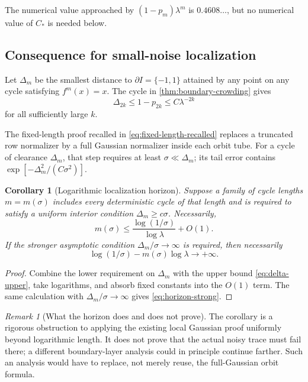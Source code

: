 \documentclass[11pt]{article}
\newtheorem{corollary}[theorem]{Corollary}
\theoremstyle{definition}
\theoremstyle{remark}
\newtheorem{remark}[theorem]{Remark}
\begin{document}
The numerical value approached by
$(1-p_m)\lambda^m$ is $0.4608\ldots$, but no numerical value of $C_*$ is
needed below.

\subsection{Consequence for small-noise localization}

Let $\Delta_m$ be the smallest distance to $\partial I=\{-1,1\}$ attained by
any point on any cycle satisfying $f^m(x)=x$.  The cycle in
\cref{thm:boundary-crowding} gives
\begin{equation}\label{eq:delta-upper}
 \Delta_{2k}\le1-p_{2k}\le C\lambda^{-2k}
\end{equation}
for all sufficiently large $k$.

The fixed-length proof recalled in \eqref{eq:fixed-length-recalled} replaces a
truncated row normalizer by a full Gaussian normalizer inside each orbit tube.
For a cycle of clearance $\Delta_m$, that step requires at least
$\sigma\ll\Delta_m$; its tail error contains
$\exp[-\Delta_m^2/(C\sigma^2)]$.

\begin{corollary}[Logarithmic localization horizon]
\label{cor:log-horizon}
Suppose a family of cycle lengths $m=m(\sigma)$ includes every deterministic
cycle of that length and is required to satisfy a uniform interior condition
$\Delta_m\ge c\sigma$.  Necessarily,
\begin{equation}\label{eq:horizon-weak}
 m(\sigma)\le
 \frac{\log(1/\sigma)}{\log\lambda}+O(1).
\end{equation}
If the stronger asymptotic condition
$\Delta_m/\sigma\to\infty$ is required, then necessarily
\begin{equation}\label{eq:horizon-strong}
 \log(1/\sigma)-m(\sigma)\log\lambda\longrightarrow+\infty.
\end{equation}
\end{corollary}

\begin{proof}
Combine the lower requirement on $\Delta_m$ with the upper bound
\eqref{eq:delta-upper}, take logarithms, and absorb fixed constants into the
$O(1)$ term.  The same calculation with
$\Delta_m/\sigma\to\infty$ gives \eqref{eq:horizon-strong}.
\end{proof}

\begin{remark}[What the horizon does and does not prove]
The corollary is a rigorous obstruction to applying the existing local
Gaussian proof uniformly beyond logarithmic length.  It does not prove that
the actual noisy trace must fail there; a different boundary-layer analysis
could in principle continue farther.  Such an analysis would have to replace,
not merely reuse, the full-Gaussian orbit formula.
\end{remark}
\end{document}
